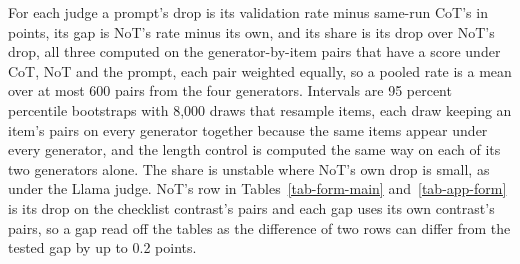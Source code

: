 For each judge a prompt's drop is its validation rate minus same-run CoT's
in points, its gap is NoT's rate minus its own, and its share is its drop
over NoT's drop, all three computed on the generator-by-item pairs that have
a score under CoT, NoT and the prompt, each pair weighted equally, so a pooled
rate is a mean over at most 600 pairs from the four generators. Intervals
are 95 percent percentile bootstraps with 8,000 draws that resample items,
each draw keeping an item's pairs on every generator together because the
same items appear under every generator, and the length control is computed
the same way on each of its two generators alone. The share is unstable where
NoT's own drop is small, as under the Llama judge. NoT's row in
Tables~\ref{tab-form-main} and~\ref{tab-app-form} is its drop on the
checklist contrast's pairs and each gap uses its own contrast's pairs, so a
gap read off the tables as the difference of two rows can differ from the
tested gap by up to 0.2 points.

